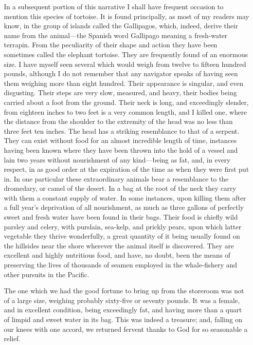 In a subsequent portion of this narrative I shall have frequent occasion to
mention this species of tortoise. It is found principally, as most of my readers
may know, in the group of islands called the Gallipagos, which, indeed, derive
their name from the animal---the Spanish word Gallipago meaning a fresh-water
terrapin. From the peculiarity of their shape and action they have been
sometimes called the elephant tortoise. They are frequently found of an enormous
size. I have myself seen several which would weigh from twelve to fifteen
hundred pounds, although I do not remember that any navigator speaks of having
seen them weighing more than eight hundred. Their appearance is singular, and
even disgusting. Their steps are very slow, measured, and heavy, their bodies
being carried about a foot from the ground. Their neck is long, and exceedingly
slender, from eighteen inches to two feet is a very common length, and I killed
one, where the distance from the shoulder to the extremity of the head was no
less than three feet ten inches. The head has a striking resemblance to that of
a serpent. They can exist without food for an almost incredible length of time,
instances having been known where they have been thrown into the hold of a
vessel and lain two years without nourishment of any kind---being as fat, and,
in every respect, in as good order at the expiration of the time as when they
were first put in. In one particular these extraordinary animals bear a
resemblance to the dromedary, or camel of the desert. In a bag at the root of
the neck they carry with them a constant supply of water. In some instances,
upon killing them after a full year's deprivation of all nourishment, as much as
three gallons of perfectly sweet and fresh water have been found in their bags.
Their food is chiefly wild parsley and celery, with purslain, sea-kelp, and
prickly pears, upon which latter vegetable they thrive wonderfully, a great
quantity of it being usually found on the hillsides near the shore wherever the
animal itself is discovered. They are excellent and highly nutritious food, and
have, no doubt, been the means of preserving the lives of thousands of seamen
employed in the whale-fishery and other pursuits in the Pacific. 

The one which we had the good fortune to bring up from the storeroom was not
of a large size, weighing probably sixty-five or seventy pounds. It was a
female, and in excellent condition, being exceedingly fat, and having more than
a quart of limpid and sweet water in its bag. This was indeed a treasure; and,
falling on our knees with one accord, we returned fervent thanks to God for so
seasonable a relief. 


